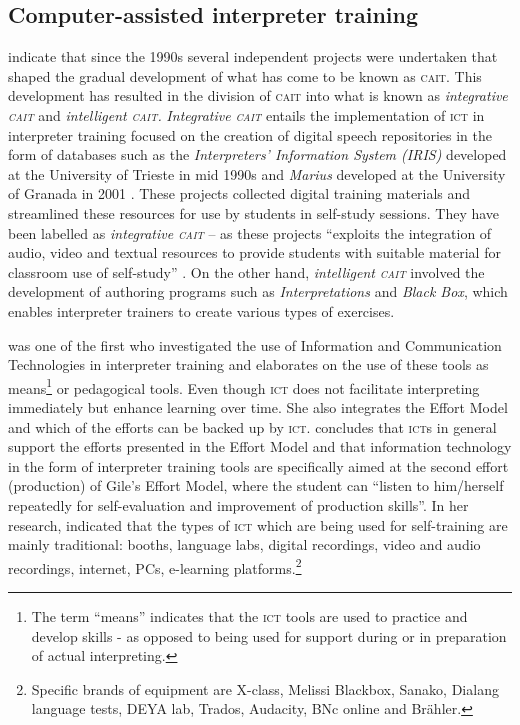 \documentclass[output=paper]{langsci/langscibook}
\begin{document}
\subsection{Computer-assisted interpreter training}
\citet{Sandrelli2007a} indicate that since the 1990s several independent projects were undertaken that shaped the gradual development of what has come to be known as \textsc{cait}. This development has resulted in the division of \textsc{cait} into what is known as \textit{integrative \textsc{cait}} and \textit{intelligent \textsc{cait}.} \textit{Integrative \textsc{cait}} entails the  implementation of \textsc{ict} in interpreter training focused on the creation of digital speech repositories in the form of databases such as the \textit{Interpreters’ Information System (\textsc{IRIS})} developed at the University of Trieste in mid 1990s \citep{Carabelli1997} and \textit{Marius} developed at the University of Granada in 2001 \citep{Pöchhacker1994}. These projects collected digital training materials and streamlined these resources for use by students in self-study sessions. They have been labelled as \textit{integrative \textsc{cait}} – as these projects “exploits the integration of audio, video and textual resources to provide students with suitable material for classroom use of self-study” \citep[277]{Sandrelli2007a}. On the other hand, \textit{intelligent \textsc{cait}} involved the development of authoring programs such as \textit{Interpretations} and \textit{Black Box}, which enables interpreter trainers to create various types of exercises. 

\citet[229]{Berber2010} was one of the first who investigated the use of Information and Communication Technologies in interpreter training and elaborates on the use of these tools as means\footnote{The term “means” indicates that the \textsc{ict} tools are used to practice and develop skills - as opposed to being used for support during or in preparation of actual interpreting.} or pedagogical tools. Even though \textsc{ict} does not facilitate interpreting immediately but enhance learning over time. She also integrates the Effort Model \citep{Gile1995} and which of the efforts can be backed up by \textsc{ict}. \citet[237]{Berber2010} concludes that \textsc{ict}s in general support the efforts presented in the Effort Model and that information technology in the form of interpreter training tools are specifically aimed at the second effort (production) of Gile’s Effort Model, where the student can “listen to him/herself repeatedly for self-evaluation and improvement of production skills”. In her research, \citet[243]{Berber2010} indicated that the types of \textsc{ict} which are being used for self-training are mainly traditional: booths, language labs, digital recordings, video and audio recordings, internet, PCs, e-learning platforms.\footnote{Specific brands of equipment are X-class, Melissi Blackbox, Sanako, Dialang language tests, DEYA lab, Trados, Audacity, BNc online and Brähler.}
\end{document}
